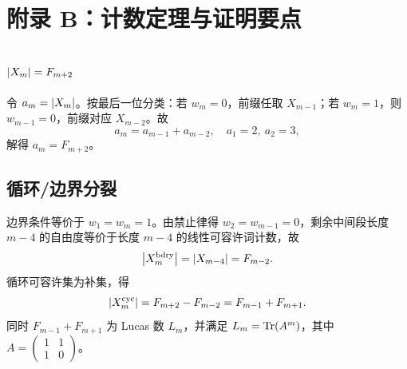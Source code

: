 \section{附录 B：计数定理与证明要点}

\subsection{\texorpdfstring{$\left\lvert X_m\right\rvert=F_{m+2}$}{|X\_m| = F\_{m+2}}}

令 $a_m=\left\lvert X_m\right\rvert$。按最后一位分类：若 $w_m=0$，前缀任取 $X_{m-1}$；若 $w_m=1$，则 $w_{m-1}=0$，前缀对应 $X_{m-2}$。故
\[
a_m=a_{m-1}+a_{m-2},\quad a_1=2,\ a_2=3,
\]
解得 $a_m=F_{m+2}$。

\subsection{循环/边界分裂}

边界条件等价于 $w_1=w_m=1$。由禁止律得 $w_2=w_{m-1}=0$，剩余中间段长度 $m-4$ 的自由度等价于长度 $m-4$ 的线性可容许词计数，故
\[
\left\lvert X_m^{\mathrm{bdry}}\right\rvert=\left\lvert X_{m-4}\right\rvert=F_{m-2}.
\]
循环可容许集为补集，得
\[
\left\lvert X_m^{\mathrm{cyc}}\right\rvert=F_{m+2}-F_{m-2}=F_{m-1}+F_{m+1}.
\]
同时 $F_{m-1}+F_{m+1}$ 为 Lucas 数 $L_m$，并满足 $L_m=\mathrm{Tr}(A^m)$，其中 $A=\begin{pmatrix}1&1\\1&0\end{pmatrix}$。

